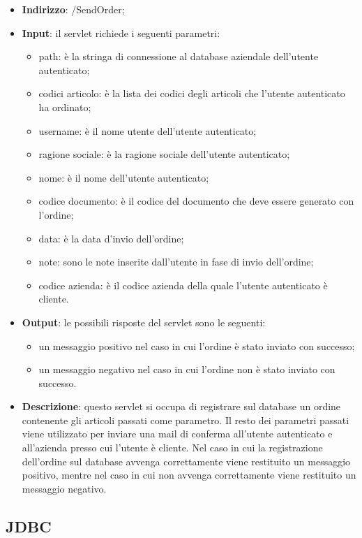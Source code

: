 \begin{itemize}
	\item \textbf{Indirizzo}: /SendOrder;
	\item \textbf{Input}: il servlet richiede i seguenti parametri:
		\begin{itemize}
			\item path: è la stringa di connessione al database aziendale dell'utente autenticato;
			\item codici articolo: è la lista dei codici degli articoli che l'utente autenticato ha ordinato;
			\item username: è il nome utente dell'utente autenticato;
			\item ragione sociale: è la ragione sociale dell'utente autenticato;
			\item nome: è il nome dell'utente autenticato;
			\item codice documento: è il codice del documento che deve essere generato con l'ordine;
			\item data: è la data d'invio dell'ordine;
			\item note: sono le note inserite dall'utente in fase di invio dell'ordine;
			\item codice azienda: è il codice azienda della quale l'utente autenticato è cliente.
		\end{itemize}
	\item \textbf{Output}: le possibili risposte del servlet sono le seguenti:
		\begin{itemize}
			\item un messaggio positivo nel caso in cui l'ordine è stato inviato con successo;
			\item un messaggio negativo nel caso in cui l'ordine non è stato inviato con successo.
		\end{itemize}
	\item \textbf{Descrizione}: questo servlet si occupa di registrare sul database un ordine contenente gli articoli passati come parametro. Il resto dei parametri passati viene utilizzato per inviare una mail di conferma all'utente autenticato e all'azienda presso cui l'utente è cliente. Nel caso in cui la registrazione dell'ordine sul database avvenga correttamente viene restituito un messaggio positivo, mentre nel caso in cui non avvenga correttamente viene restituito un messaggio negativo.
\end{itemize}

\subsection{JDBC}

